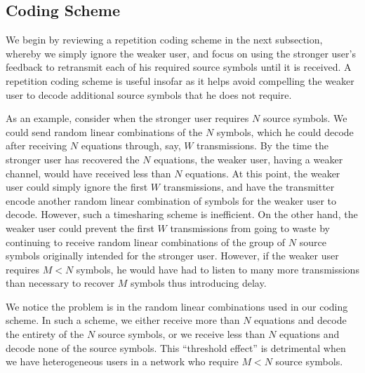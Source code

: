 
\subsection{Coding Scheme}

We begin by reviewing a repetition coding scheme in the next subsection, whereby we simply ignore the weaker user, and focus on using the stronger user's feedback to retransmit each of his required source symbols until it is received.  A repetition coding scheme is useful insofar as it helps avoid compelling the weaker user to decode additional source symbols that he does not require.  

As an example, consider when the stronger user requires $N$ source symbols.  We could send random linear combinations of the $N$ symbols, which he could decode after receiving $N$ equations through, say, $W$ transmissions.  By the time the stronger user has recovered the $N$ equations, the weaker user, having a weaker channel, would have received less than $N$ equations.  At this point, the weaker user could simply ignore the first $W$ transmissions, and have the transmitter encode another random linear combination of symbols for the weaker user to decode.  However, such a timesharing scheme is inefficient.  
%
On the other hand, the weaker user could prevent the first $W$ transmissions from going to waste by continuing to receive random linear combinations of the group of $N$ source symbols originally intended for the stronger user.  However, if the weaker user requires $M < N$ symbols, he would have had to listen to many more transmissions than necessary to recover $M$ symbols thus introducing delay.

We notice the problem is in the random linear combinations used in our coding scheme.  In such a scheme, we either receive more than $N$ equations and decode the entirety of the $N$ source symbols, or we receive less than $N$ equations and decode none of the source symbols.  This ``threshold effect'' is detrimental when we have heterogeneous users in a network who require $M < N$ source symbols.  



